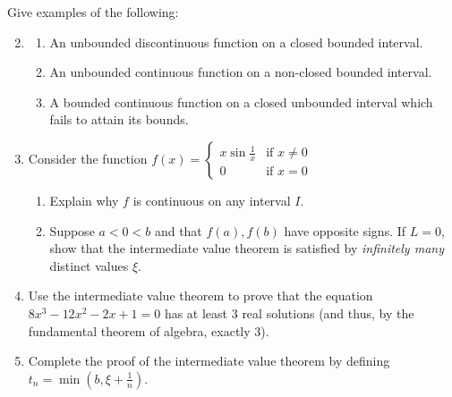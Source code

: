 \begin{exercises}
\exstart Give examples of the following:\vspace{-5pt}
\begin{enumerate}\setcounter{enumi}{1}  
  \item[]\begin{enumerate}
    \item An unbounded discontinuous function on a closed bounded interval.
    \item An unbounded continuous function on a non-closed bounded interval.
    \item A bounded continuous function on a closed unbounded interval which fails to attain its bounds.
	\end{enumerate}
	

	
	\item\label{exs:intvalinfty} Consider the function $f(x)=\begin{cases}
	x\sin\frac 1x&\text{if }x\neq 0\\
	0&\text{if }x=0
	\end{cases}$
	\begin{enumerate}
	  \item Explain why $f$ is continuous on any interval $I$.
	  \item Suppose $a<0<b$ and that $f(a),f(b)$ have opposite signs. If $L=0$, show that the intermediate value theorem is satisfied by \emph{infinitely many} distinct values $\xi$.
	\end{enumerate}

	\item Use the intermediate value theorem to prove that the equation $8x^3-12x^2-2x+1=0$ has at least 3 real solutions (and thus, by the fundamental theorem of algebra, exactly 3).
	
	\item\label{exs:ivtproof} Complete the proof of the intermediate value theorem by defining $t_n=\min(b,\xi+\frac 1n)$.
	

\end{enumerate}
\end{exercises}
